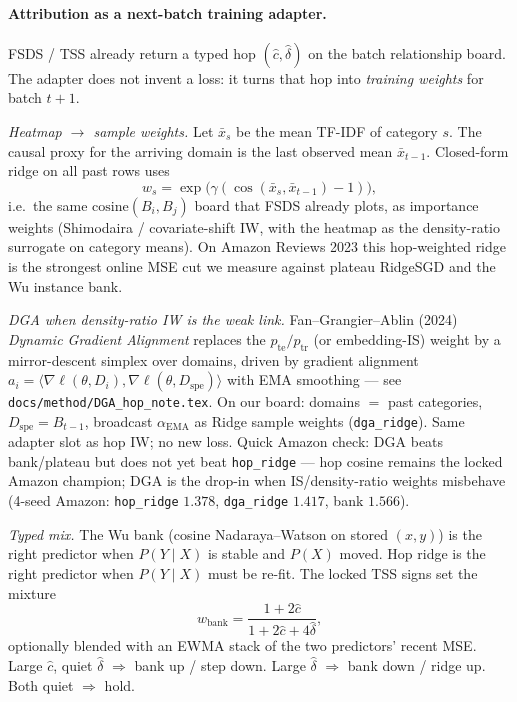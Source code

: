 
\paragraph{Attribution as a next-batch training adapter.}
FSDS / TSS already return a typed hop $(\hat c,\hat\delta)$ on the batch
relationship board.
The adapter does not invent a loss: it turns that hop into
\emph{training weights} for batch $t{+}1$.

\emph{Heatmap $\to$ sample weights.}
Let $\bar x_s$ be the mean TF-IDF of category $s$.
The causal proxy for the arriving domain is the last observed mean
$\bar x_{t-1}$. Closed-form ridge on all past rows uses
\begin{equation}
  w_s
  =
  \exp\bigl(\gamma(\cos(\bar x_s,\bar x_{t-1})-1)\bigr),
\end{equation}
i.e.\ the same $\mathrm{cosine}(B_i,B_j)$ board that FSDS already plots,
as importance weights (Shimodaira / covariate-shift IW, with the heatmap as
the density-ratio surrogate on category means).
On Amazon Reviews 2023 this hop-weighted ridge is the strongest online MSE
cut we measure against plateau RidgeSGD and the Wu instance bank.

\emph{DGA when density-ratio IW is the weak link.}
Fan--Grangier--Ablin (2024) \emph{Dynamic Gradient Alignment} replaces the
$p_{\mathrm{te}}/p_{\mathrm{tr}}$ (or embedding-IS) weight by a mirror-descent
simplex over domains, driven by gradient alignment
$a_i=\langle\nabla\ell(\theta,D_i),\nabla\ell(\theta,D_{\mathrm{spe}})\rangle$
with EMA smoothing --- see \texttt{docs/method/DGA\_hop\_note.tex}.
On our board: domains $=$ past categories, $D_{\mathrm{spe}}=B_{t-1}$,
broadcast $\alpha_{\mathrm{EMA}}$ as Ridge sample weights
(\texttt{dga\_ridge}). Same adapter slot as hop IW; no new loss.
Quick Amazon check: DGA beats bank/plateau but does not yet beat
\texttt{hop\_ridge} --- hop cosine remains the locked Amazon champion;
DGA is the drop-in when IS/density-ratio weights misbehave
(4-seed Amazon: \texttt{hop\_ridge} $1.378$, \texttt{dga\_ridge} $1.417$,
bank $1.566$).

\emph{Typed mix.}
The Wu bank (cosine Nadaraya--Watson on stored $(x,y)$) is the right
predictor when $P(Y\mid X)$ is stable and $P(X)$ moved.
Hop ridge is the right predictor when $P(Y\mid X)$ must be re-fit.
The locked TSS signs set the mixture
\begin{equation}
  w_{\mathrm{bank}}
  =
  \frac{1+2\hat c}{1+2\hat c+4\hat\delta},
\end{equation}
optionally blended with an EWMA stack of the two predictors' recent MSE.
Large $\hat c$, quiet $\hat\delta$ $\Rightarrow$ bank up / step down.
Large $\hat\delta$ $\Rightarrow$ bank down / ridge up.
Both quiet $\Rightarrow$ hold.

